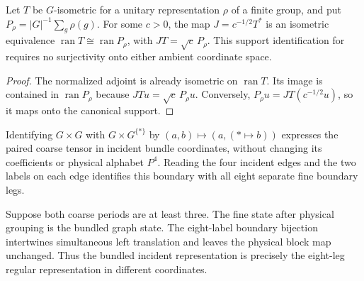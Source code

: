 
\begin{lemma}%
    \label{thm:peps_g_isometric_canonical_support}
    \leanok
    Let $T$ be $G$-isometric for a unitary representation $\rho$ of a finite
    group, and put $P_\rho=|G|^{-1}\sum_g\rho(g)$. For some $c>0$, the map
    $J=c^{-1/2}T^*$ is an isometric equivalence
    $\operatorname{ran}T\cong\operatorname{ran}P_\rho$, with
    $JT=\sqrt c\,P_\rho$. This support identification for
    \cite[Observations~6.4 and~6.6]{Schuch2010PEPS} requires no surjectivity
    onto either ambient coordinate space.
\end{lemma}

\begin{proof}\leanok
    The normalized adjoint is already isometric on $\operatorname{ran}T$.
    Its image is contained in $\operatorname{ran}P_\rho$ because
    $JTu=\sqrt c\,P_\rho u$. Conversely, $P_\rho u=JT(c^{-1/2}u)$,
    so it maps onto the canonical support.
\end{proof}

\begin{definition}%
    \label{def:peps_two_by_two_bundle_coordinates}
    \leanok
    Identifying $G\times G$ with $G\times G^{\{*\}}$ by
    $(a,b)\mapsto(a,(*\mapsto b))$ expresses the paired coarse tensor
    in incident bundle coordinates, without changing its coefficients
    or physical alphabet $P^4$. Reading the four incident edges and the two
    labels on each edge identifies this boundary with all eight separate
    fine boundary legs.
\end{definition}

\begin{lemma}%
    \label{thm:peps_two_by_two_bundle_coordinates}
    \leanok
    Suppose both coarse periods are at least three. The fine state after
    physical grouping is the bundled graph state.
    The eight-label boundary bijection intertwines simultaneous left
    translation and leaves the physical block map unchanged. Thus the
    bundled incident representation is precisely the eight-leg regular
    representation in different coordinates.
\end{lemma}

